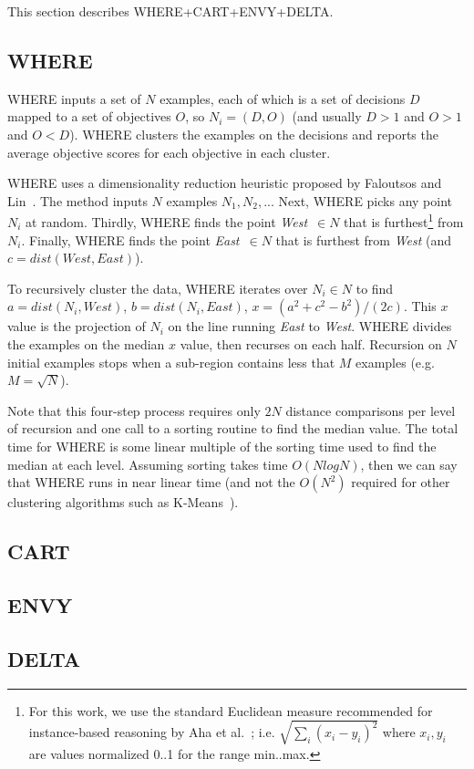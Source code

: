 This section describes WHERE+CART+ENVY+DELTA.

\subsection{WHERE}
WHERE inputs a set of $N$ examples, each of which is a set of decisions $D$
mapped to a set of objectives  $O$, so $N_i= (D,O)$ (and usually $D>1$ and $O>1$ and 
$O<D$).
WHERE clusters the examples on the decisions and reports the average objective
scores for each objective in each cluster.

WHERE uses a dimensionality reduction heuristic proposed by
Faloutsos and Lin~\cite{Faloutsos1995}. The method 
inputs
$N$
examples $N_1,N_2,..$. Next, WHERE
picks any
point $N_i$ at random. Thirdly, WHERE
finds the point  {\em West}~$\in N$ that is
furthest\footnote{
 For this work, we use the standard Euclidean measure recommended for
instance-based reasoning by Aha et al.~\cite{aha91};
i.e. $\sqrt{\sum_i(x_i-y_i)^2}$ where $x_i,y_i$ 
are values normalized 0..1 for the range min..max.}
from $N_i$.
Finally, WHERE
finds the point {\em East}~$\in N$
that is furthest from {\em West} (and 
$c=\mathit{dist}(\mathit{West},\mathit{East})$).

To recursively cluster the data, WHERE iterates over $N_i \in N$
to find
\mbox{$a=\mathit{dist}(N_i,\mathit{West})$},
\mbox{$b=\mathit{dist}(N_i,\mathit{East})$},
\mbox{$x=(a^2 + c^2 - b^2)/(2c)$}.
This  $x$ value is the projection of $N_i$
on the line  running  {\em East} to {\em West}.  WHERE divides
the examples on the median $x$ value,
then recurses on each half. 
Recursion on
$N$ initial
examples stops when a sub-region
contains less that  $M$ examples (e.g. 
$M=\sqrt{N}$).

Note that this four-step  
process requires only $2N$ distance comparisons
per level of recursion and one call to a sorting routine
to find the median value. 
The total time for WHERE is some linear multiple of the sorting time
used to find the median at each level.
Assuming sorting takes time $O(NlogN)$, then we can say 
that WHERE runs in near linear time
(and not the $O(N^2)$ required for 
other clustering algorithms such as K-Means~\cite{hamerly2010making}).

\subsection{CART}

\subsection{ENVY}

\subsection{DELTA}

